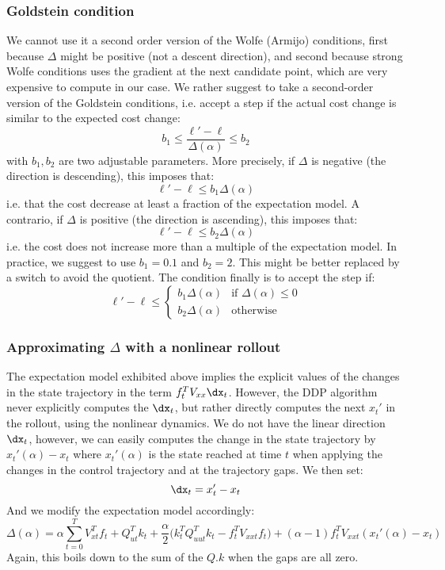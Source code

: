 \documentclass[10pt,a4paper]{article}
\begin{document}
\subsubsection{Goldstein condition}
We cannot use it a second order version of the Wolfe (Armijo) conditions, first because $\Delta$ might be positive (not a descent direction), and second because strong Wolfe conditions uses the gradient at the next candidate point, which are very expensive to compute in our case.
We rather suggest to take a second-order version of the Goldstein conditions, i.e. accept a step if the actual cost change is similar to the expected cost change:
$$ b_1 \le \frac{\ell'-\ell}{\Delta(\alpha)} \le b_2$$
with $b_1,b_2$ are two adjustable parameters.
More precisely, if $\Delta$ is negative (the direction is descending), this imposes that:
$$\ell'-\ell \le b_1 \Delta(\alpha)$$
i.e. that the cost decrease at least a fraction of the expectation model.
A contrario, if $\Delta$ is positive (the direction is ascending), this imposes that:
$$\ell'-\ell \le b_2 \Delta(\alpha)$$
i.e. the cost does not increase more than a multiple of the expectation model.
In practice, we suggest to use $b_1=0.1$ and $b_2=2$.
This might be better replaced by a switch to avoid the quotient.
The condition finally is to accept the step if:
$$\ell'-\ell \le
\begin{cases}
  b_1 \Delta(\alpha) & \textrm{if }\Delta(\alpha)\le 0 \\
  b_2 \Delta(\alpha) & \textrm{otherwise}
\end{cases}
$$

\subsubsection{Approximating $\Delta$ with a nonlinear rollout}

The expectation model exhibited above implies the explicit values of the changes in the state trajectory in the term $f_t^T V_{xx} \dx_t$.
However, the DDP algorithm never explicitly computes the $\dx_t$, but rather directly computes the next $x_t'$ in the rollout, using the nonlinear dynamics.
We do not have the linear direction $\dx_t$, however, we can easily computes the change in the state trajectory by $x_t'(\alpha)-x_t$ where $x_t'(\alpha)$ is the state reached at time $t$ when applying the changes in the control trajectory and at the trajectory gaps.
We then set:
$$\dx_t = x_t'-x_t$$
And we modify the expectation model accordingly:
$$\Delta(\alpha) = \alpha \sum_{t=0}^T V_{xt}^T f_t + Q_{ut}^T k_t
+ \frac{\alpha}{2} \Big( k_t^T Q_{uut}^T k_t-f_t^T V_{xxt} f_t \Big)
+ (\alpha-1) f_t^T V_{xxt} (x_t'(\alpha) - x_t)$$
Again, this boils down to the sum of the $Q.k$ when the gaps are all zero.




{
\small

}
\end{document}
